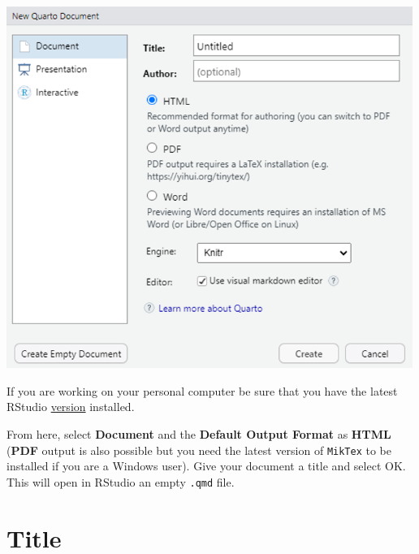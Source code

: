 \documentclass[
  letterpaper,
  DIV=11,
  numbers=noendperiod]{scrartcl}
\begin{document}
\begin{center}
\includegraphics[width=5.20833in,height=\textheight]{images/quarto1.png}
\end{center}

\begin{tcolorbox}[enhanced jigsaw, colbacktitle=quarto-callout-important-color!10!white, bottomtitle=1mm, rightrule=.15mm, titlerule=0mm, opacityback=0, colframe=quarto-callout-important-color-frame, breakable, leftrule=.75mm, opacitybacktitle=0.6, coltitle=black, toptitle=1mm, title=\textcolor{quarto-callout-important-color}{\faExclamation}\hspace{0.5em}{Important}, colback=white, arc=.35mm, toprule=.15mm, left=2mm, bottomrule=.15mm]

If you are working on your personal computer be sure that you have the
latest RStudio
\href{https://posit.co/download/rstudio-desktop/}{version} installed.

\end{tcolorbox}

From here, select \textbf{Document} and the \textbf{Default Output
Format} as \textbf{HTML} (\textbf{PDF} output is also possible but you
need the latest version of \texttt{MikTex} to be installed if you are a
Windows user). Give your document a title and select OK. This will open
in RStudio an empty \texttt{.qmd} file.

\section{Title}\label{sec-title}
\end{document}
